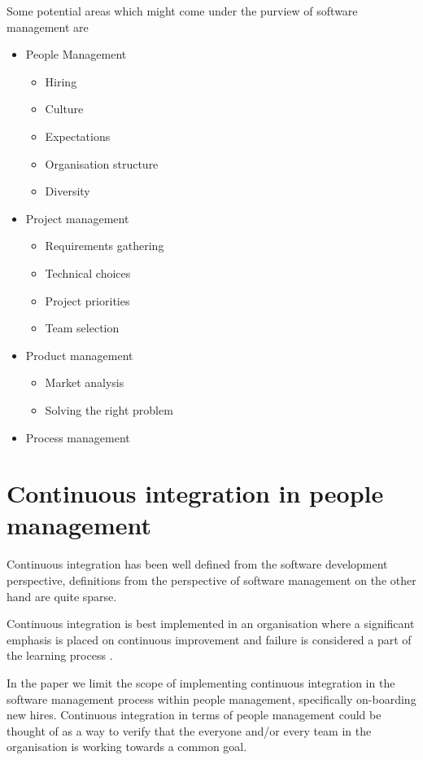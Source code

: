 \documentclass[12pt,conference]{IEEEtran}
\begin{document}
Some potential areas which might come under the purview of software management are

\begin{itemize}

\item People Management
\begin{itemize}
\item Hiring
\item Culture
\item Expectations
\item Organisation structure
\item Diversity
\end{itemize}

\item Project management
\begin{itemize}
\item Requirements gathering
\item Technical choices
\item Project priorities
\item Team selection
\end{itemize}

\item Product management
\begin{itemize}
\item Market analysis
\item Solving the right problem
\end{itemize}

\item Process management
\end{itemize}


\section*{Continuous integration in people management}


Continuous integration has been well defined from the software development perspective, definitions from the perspective of software management on the other hand are quite sparse. 

Continuous integration is best implemented in an organisation where a significant emphasis is placed on continuous improvement and failure is considered a part of the learning process \cite{edmondson_strategies_2011}.

In the paper we limit the scope of implementing continuous integration in the software management process within people management, specifically on-boarding new hires. Continuous integration in terms of people management could be thought of as a way to verify that the everyone and/or every team in the organisation is working towards a common goal.
\end{document}

